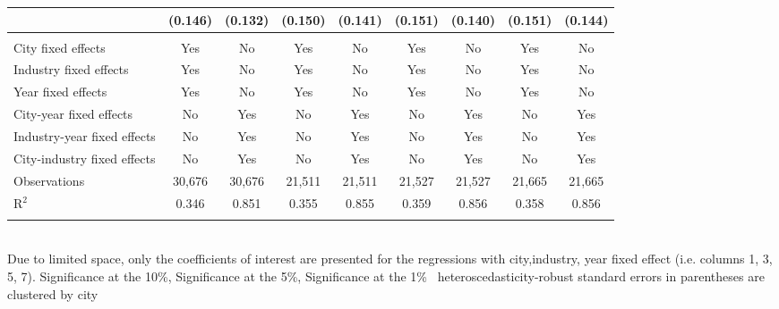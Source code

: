 \documentclass[12pt]{article}
\begin{document}
\begin{table}[!htbp]
\begin{adjustbox}{width=\textwidth, totalheight=\baselineskip,keepaspectratio}
\begin{tabular}{@{\extracolsep{5pt}}lcccccccc}
  & (0.146) & (0.132) & (0.150) & (0.141) & (0.151) & (0.140) & (0.151) & (0.144) \\ 
 \hline \\[-1.8ex] 
City fixed effects & Yes & No & Yes & No & Yes & No & Yes & No \\ 
Industry fixed effects & Yes & No & Yes & No & Yes & No & Yes & No \\ 
Year fixed effects & Yes & No & Yes & No & Yes & No & Yes & No \\ 
City-year fixed effects & No & Yes & No & Yes & No & Yes & No & Yes \\ 
Industry-year fixed effects & No & Yes & No & Yes & No & Yes & No & Yes \\ 
City-industry fixed effects & No & Yes & No & Yes & No & Yes & No & Yes \\ 
Observations & 30,676 & 30,676 & 21,511 & 21,511 & 21,527 & 21,527 & 21,665 & 21,665 \\ 
R$^{2}$ & 0.346 & 0.851 & 0.355 & 0.855 & 0.359 & 0.856 & 0.358 & 0.856 \\ 
\hline 
\hline \\[-1.8ex] 
\end{tabular}
\end{adjustbox}
\begin{tablenotes} 
 \small 
 \item \\ 
\footnotesize{
Due to limited space, only the coefficients of interest are presented 
for the regressions with city,industry, year fixed effect (i.e. columns 1, 3, 5, 7).
\sym{*} Significance at the 10\%, \sym{**} Significance at the 5\%, \sym{***} Significance at the 1\% \
heteroscedasticity-robust standard errors in parentheses are clustered by city 
}
 
\end{tablenotes}
\end{table}
\end{document}
